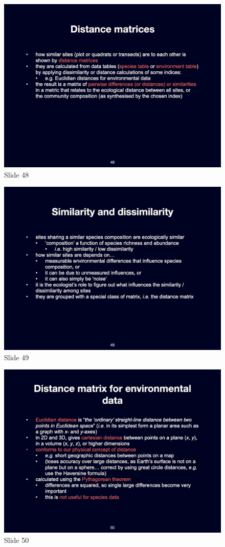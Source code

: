 \documentclass[
  10pt,
]{book}
\begin{document}
\begin{figure}[ht]
\centering
\includegraphics[width=0.8\linewidth]{../images/BDC334/BDC334-048.jpeg}
\caption*{Slide 48}
\end{figure}

\begin{figure}[ht]
\centering
\includegraphics[width=0.8\linewidth]{../images/BDC334/BDC334-049.jpeg}
\caption*{Slide 49}
\end{figure}

\begin{figure}[ht]
\centering
\includegraphics[width=0.8\linewidth]{../images/BDC334/BDC334-050.jpeg}
\caption*{Slide 50}
\end{figure}
\end{document}
